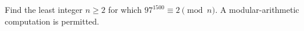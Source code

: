 Find the least integer $n\ge2$ for which $97^{1500}\equiv2\pmod n$. A modular-arithmetic computation is permitted.
